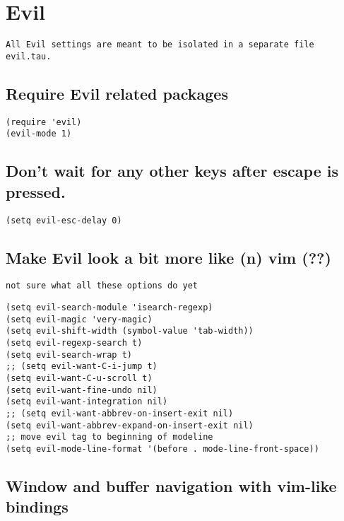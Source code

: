 \documentclass[11pt]{article}
\begin{document}
\section*{Evil}
\label{sec:orge233c30}

\begin{verbatim}
All Evil settings are meant to be isolated in a separate file evil.tau.
\end{verbatim}

\subsection*{Require Evil related packages}
\label{sec:org4a3591a}

\begin{verbatim}
(require 'evil)
(evil-mode 1)
\end{verbatim}

\subsection*{Don't wait for any other keys after escape is pressed.}
\label{sec:org6a53348}
\begin{verbatim}
(setq evil-esc-delay 0)
\end{verbatim}

\subsection*{Make Evil look a bit more like (n) vim  (??)}
\label{sec:org8cc7190}
\begin{verbatim}
not sure what all these options do yet
\end{verbatim}


\begin{verbatim}
(setq evil-search-module 'isearch-regexp)
(setq evil-magic 'very-magic)
(setq evil-shift-width (symbol-value 'tab-width))
(setq evil-regexp-search t)
(setq evil-search-wrap t)
;; (setq evil-want-C-i-jump t)
(setq evil-want-C-u-scroll t)
(setq evil-want-fine-undo nil)
(setq evil-want-integration nil)
;; (setq evil-want-abbrev-on-insert-exit nil)
(setq evil-want-abbrev-expand-on-insert-exit nil)
;; move evil tag to beginning of modeline
(setq evil-mode-line-format '(before . mode-line-front-space))
\end{verbatim}

\subsection*{Window and buffer navigation with vim-like bindings}
\label{sec:orgbb97fd8}
\end{document}
